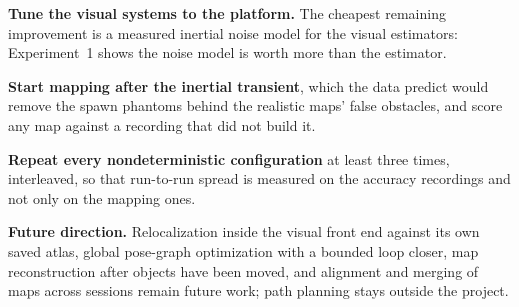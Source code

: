 \textbf{Tune the visual systems to the platform.} The cheapest remaining
improvement is a measured inertial noise model for the visual estimators:
Experiment~1 shows the noise model is worth more than the estimator.

\textbf{Start mapping after the inertial transient}, which the data predict
would remove the spawn phantoms behind the realistic maps' false obstacles,
and score any map against a recording that did not build it.

\textbf{Repeat every nondeterministic configuration} at least three times,
interleaved, so that run-to-run spread is measured on the accuracy recordings
and not only on the mapping ones.

\textbf{Future direction.} Relocalization inside the visual front end against
its own saved atlas,
global pose-graph optimization with a bounded loop closer, map reconstruction
after objects have been moved, and alignment and merging of maps across
sessions remain future work; path planning stays outside the project.
